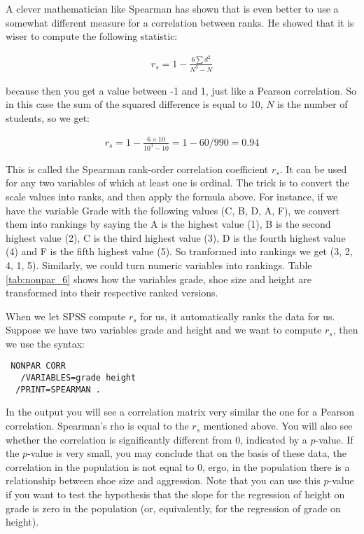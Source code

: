 A clever mathematician like Spearman has shown that is even better to use a somewhat different measure for a correlation between ranks. He showed that it is wiser to compute the following statistic:

\begin{eqnarray}
r_s = 1 - \frac{6 \sum d^2 }{N^3-N}
\end{eqnarray}

because then you get a value between -1 and 1, just like a Pearson correlation. So in this case the sum of the squared difference is equal to 10, $N$ is the number of students, so we get:


\begin{eqnarray}
r_s = 1 - \frac{6 \times 10  }{10^3-10} = 1 - 60 /990 = 0.94
\end{eqnarray}


This is called the Spearman rank-order correlation coefficient $r_s$. It can be used for any two variables of which at least one is ordinal. The trick is to convert the scale values into ranks, and then apply the formula above. For instance, if we have the variable Grade with the following values (C, B, D, A, F), we convert them into rankings by saying the A is the highest value (1), B is the second highest value (2), C is the third highest value (3), D is the fourth highest value (4) and F is the fifth highest value (5). So tranformed into rankings we get (3, 2, 4, 1, 5). Similarly, we could turn numeric variables into rankings. Table \ref{tab:nonpar_6} shows how the variables grade, shoe size and height are transformed into their respective ranked versions. 

\begin{kframe}


{\ttfamily\noindent\bfseries{}}\end{kframe}


When we let SPSS compute $r_s$ for us, it automatically ranks the data for us. Suppose we have two variables grade and height and we want to compute $r_s$, then we use the syntax:

 \begin{verbatim}
 NONPAR CORR 
   /VARIABLES=grade height 
  /PRINT=SPEARMAN .
 \end{verbatim}
  
In the output you will see a correlation matrix very similar the one for a Pearson correlation. Spearman's rho is equal to the $r_s$ mentioned above. You will also see whether the correlation is significantly different from 0, indicated by a $p$-value. If the $p$-value is very small, you may conclude that on the basis of these data, the correlation in the population is not equal to 0, ergo, in the population there is a relationship between shoe size and aggression. Note that you can use this $p$-value if you want to test the hypothesis that the slope for the regression of height on grade is zero in the population (or, equivalently, for the regression of grade on height).  
  

